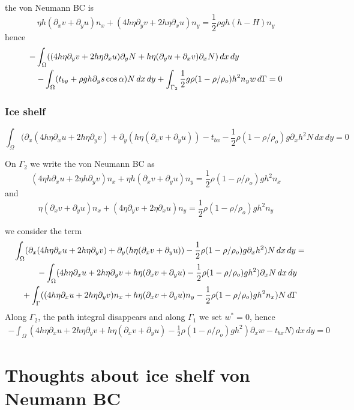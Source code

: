 \documentclass[10pt,a4paper]{book}
\newcommand{\p}{\partial}
\newcommand{\tbx}{t_{bx}}
\newcommand{\tby}{t_{by}}
\begin{document}
the von Neumann BC is
\[
\eta h (\p_x v + \p_y u) n_x + ( 4 h \eta \p_y v + 2 h \eta \p_x u) n_y =\frac{1}{2} \rho g h (h-H) n_y
\]
hence
\begin{eqnarray}
\lefteqn{-\int_{\Omega} (( 4 h \eta \p_y v + 2 h \eta \p_x u) \p_y N +  h \eta (\p_y u + \p_x v) \p_x N )\, dx \, dy }\nonumber \\
& & - \int_{\Omega} (\tby + \rho g h \p_y s \cos \alpha ) N \, dx \, dy + \int_{\Gamma_2}
\frac{1}{2} g \rho (1-\rho/\rho_o)  h^2  n_y w\, d\Gamma=0 \nonumber
\end{eqnarray}

\subsubsection{Ice shelf}

\[
\int_{\Omega} (\p_x ( 4 h \eta \p_x u + 2 h \eta \p_y v) +\p_y ( h \eta (\p_x v + \p_y u)) - \tbx-
\frac{1}{2}\rho (1-\rho/\rho_o) g  \p_x h^2  N \,dx \,dy =0
\]

On $\Gamma_2$ we write the von Neumann BC as
\[
( 4 \eta h \p_x u + 2 \eta h \p_y v) n_x + \eta h (\p_x v +\p_y u) n_y =\frac{1}{2} \rho
(1-\rho/\rho_o) g h^2 n_x
\]
and
\[
\eta (\p_x v + \p_y u) n_x + ( 4 \eta \p_y v + 2 \eta \p_x u) n_y =\frac{1}{2} \rho 
(1-\rho/\rho_o) g h^2 n_y
\]

we consider the term
\begin{eqnarray}
\lefteqn{\int_{\Omega} (\p_x ( 4 h \eta \p_x u + 2 h \eta \p_y v) +\p_y ( h \eta (\p_x v + \p_y u))
- \frac{1}{2}\rho (1-\rho/\rho_o) g  \p_x h^2) N \, dx \, dy =} \\
& &-\int_{\Omega} ( 4 h \eta \p_x u + 2 h \eta \p_y v +  h \eta (\p_x v + \p_y u) -\frac{1}{2}\rho
(1-\rho/\rho_o) g  h^2) \p_x N \, dx \, dy   \\
& & +\int_{\Gamma} ((4 h \eta \p_x u + 2 h \eta \p_y v) n_x + h \eta (\p_x v + \p_y u) n_y -\frac{1}{2}\rho (1-\rho/\rho_o) g  h^2 n_x) N  \, d \Gamma 
\end{eqnarray}
Along $\Gamma_2$, the path integral disappears and along $\Gamma_1$ we set $w^\ast=0$,  hence
\begin{eqnarray} 
-\int_{\Omega}(4 h \eta \p_x u + 2 h \eta \p_y v +  h \eta (\p_x v + \p_y u ) - \frac{1}{2} \rho (1-\rho/\rho_o) g h^2)  \p_x w
-\tbx N ) \,dx \,dy   =0
\end{eqnarray}

\section{Thoughts about ice shelf von Neumann BC}
\end{document}
